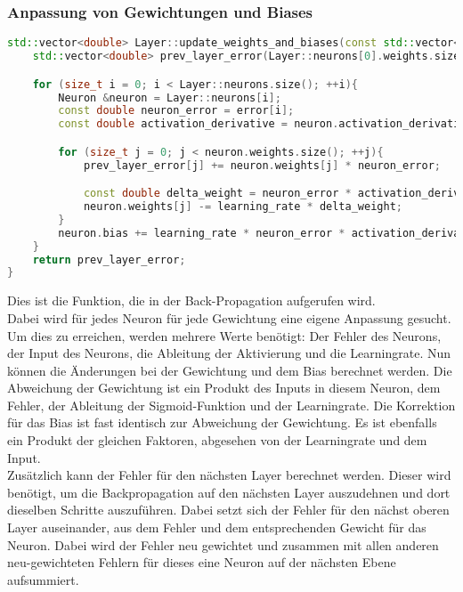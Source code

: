 \subsubsection{Anpassung von Gewichtungen und Biases}
\label{sec:RealAnpassungVonGewichtungenUndBiasesCode}
\begin{lstlisting}[language=C++]
std::vector<double> Layer::update_weights_and_biases(const std::vector<double>& error, double learning_rate){
    std::vector<double> prev_layer_error(Layer::neurons[0].weights.size(), 0.0);

    for (size_t i = 0; i < Layer::neurons.size(); ++i){
        Neuron &neuron = Layer::neurons[i];
        const double neuron_error = error[i];
        const double activation_derivative = neuron.activation_derivative();

        for (size_t j = 0; j < neuron.weights.size(); ++j){
            prev_layer_error[j] += neuron.weights[j] * neuron_error;

            const double delta_weight = neuron_error * activation_derivative * neuron.inputs[j];
            neuron.weights[j] -= learning_rate * delta_weight;
        }
        neuron.bias += learning_rate * neuron_error * activation_derivative;
    }
    return prev_layer_error;
}
\end{lstlisting}
Dies ist die Funktion, die in der Back-Propagation aufgerufen wird.
\\
Dabei wird für jedes Neuron für jede Gewichtung eine eigene Anpassung gesucht. Um dies zu erreichen, werden mehrere Werte benötigt: 
Der Fehler des Neurons, der Input des Neurons, die Ableitung der Aktivierung und die Learningrate.
Nun können die Änderungen bei der Gewichtung und dem Bias berechnet werden. Die Abweichung der Gewichtung ist ein Produkt des Inputs in diesem Neuron, dem Fehler, der Ableitung der Sigmoid-Funktion und der Learningrate. Die Korrektion für das Bias ist fast identisch zur Abweichung der Gewichtung. Es ist ebenfalls ein Produkt der gleichen Faktoren, abgesehen von der Learningrate und dem Input.
\\
Zusätzlich kann der Fehler für den nächsten Layer berechnet werden. Dieser wird benötigt, um die Backpropagation auf den nächsten Layer auszudehnen und dort dieselben Schritte auszuführen. Dabei setzt sich der Fehler für den nächst oberen Layer auseinander, aus dem
Fehler und dem entsprechenden Gewicht für das Neuron. Dabei wird der 
Fehler neu gewichtet und zusammen mit allen anderen neu-gewichteten Fehlern für dieses eine Neuron auf der nächsten Ebene aufsummiert.

